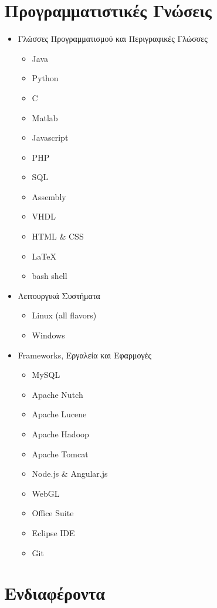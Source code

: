 \documentclass[print]{keros-cv} %
\begin{document}
\section{Προγραμματιστικές Γνώσεις}
\begin{itemize}
\item Γλώσσες Προγραμματισμού και Περιγραφικές Γλώσσες
\begin{itemize}
\item[] Java
\item[] Python
\item[] C
\item[] Matlab
\item[] Javascript
\item[] PHP
\item[] SQL
\item[] Assembly
\item[] VHDL
\item[] HTML \& CSS
\item[] LaTeX
\item[] bash shell
\end{itemize}
\item Λειτουργικά Συστήματα
\begin{itemize}
\item[] Linux (all flavors)
\item[] Windows
\end{itemize}
\item Frameworks, Εργαλεία και Εφαρμογές
\begin{itemize}
\item[] MySQL
\item[] Apache Nutch
\item[] Apache Lucene
\item[] Apache Hadoop
\item[] Apache Tomcat
\item[] Node.js \& Angular.js
\item[] WebGL
\item[] Office Suite
\item[] Eclipse IDE
\item[] Git
\end{itemize}
\end{itemize}


\section{Ενδιαφέροντα}
\end{document}
